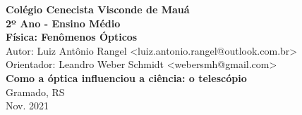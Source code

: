 \documentclass[a4paper, 12pt]{article}
\begin{document}
\begin{center}
	\thispagestyle{empty}
	\textbf{Colégio Cenecista Visconde de Mauá}\\
	\textbf{2º Ano - Ensino Médio}\\
	\textbf{Física: Fenômenos Ópticos}\\
\vspace{6cm}
	Autor: Luiz Antônio Rangel <luiz.antonio.rangel@outlook.com.br>\\
	Orientador: Leandro Weber Schmidt <webersmh@gmail.com>\\
\vspace{5cm}
	\textbf{Como a óptica influenciou a ciência: o telescópio}\\
\vspace{5cm}
	Gramado, RS\\
	Nov. 2021
\end{center}
\end{document}
